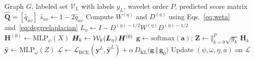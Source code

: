 \begin{algorithm}[h]
\caption{ESO-GAD training}
\label{alg:ecsbwgnn}
\begin{algorithmic}[1]
\REQUIRE Graph $G$, labeled set $\mathcal{V}_L$ with labels $y_L$, wavelet order $P$, predicted score matrix $\hat{\bm Q}=[\hat q_{uv}]$
  \STATE $\hat s_{uv} \gets 1-2\hat{q}_{uv}$
  \STATE Compute $W^{(\eta)}$ and $D^{(\eta)}$ using Eqs.~\eqref{eq:weta} and~\eqref{eq:degreelaplacian}
  \STATE $L_\eta \gets I - D^{(\eta)-1/2}W^{(\eta)}D^{(\eta)-1/2}$
  \STATE $\bm H^{(0)} \gets \text{MLP}_\psi(X)$
    \STATE $\bm H_k \gets \mathcal{W}_k(\bm{L}_{\eta})\,\bm H^{(0)}$
  \ENDFOR
  \STATE $\bm{g} \gets \mathrm{softmax}(\bm{a})$; $\bm Z \gets \big\Vert_{k=0}^{P}\sqrt{g_k}\,\bm{H}_k$
  \STATE $\hat{\bm{y}} \gets \text{MLP}_\omega(Z)$
  \STATE $\mathcal L \gets \mathcal{L}_{\mathrm{BCE}}(\bm{y}^L,\hat{\bm{y}}^L) +\alpha\, D_{\mathrm{KL}}\!\bigl(\bm{g}\,\Vert\,\bm{g}_0\bigr)$
  \STATE Update $(\psi,\omega,\eta,a)$ on $\mathcal L$
\ENDFOR
\end{algorithmic}
\end{algorithm}